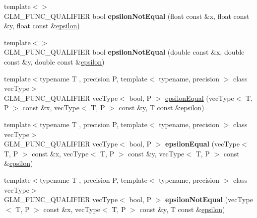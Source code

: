\begin{DoxyCompactItemize}
\item 
{\footnotesize template$<$$>$ }\\G\+L\+M\+\_\+\+F\+U\+N\+C\+\_\+\+Q\+U\+A\+L\+I\+F\+I\+ER bool {\bfseries epsilon\+Not\+Equal} (float const \&x, float const \&y, float const \&\hyperlink{group__gtc__constants_gacb41049b8d22c8aa90e362b96c524feb}{epsilon})\hypertarget{namespaceglm_af4127d65f4afc6e447d461bae25f90fe}{}\label{namespaceglm_af4127d65f4afc6e447d461bae25f90fe}

\item 
{\footnotesize template$<$$>$ }\\G\+L\+M\+\_\+\+F\+U\+N\+C\+\_\+\+Q\+U\+A\+L\+I\+F\+I\+ER bool {\bfseries epsilon\+Not\+Equal} (double const \&x, double const \&y, double const \&\hyperlink{group__gtc__constants_gacb41049b8d22c8aa90e362b96c524feb}{epsilon})\hypertarget{namespaceglm_a68d8ce38812c8599018e404afc79f088}{}\label{namespaceglm_a68d8ce38812c8599018e404afc79f088}

\item 
{\footnotesize template$<$typename T , precision P, template$<$ typename, precision $>$ class vec\+Type$>$ }\\G\+L\+M\+\_\+\+F\+U\+N\+C\+\_\+\+Q\+U\+A\+L\+I\+F\+I\+ER vec\+Type$<$ bool, P $>$ \hyperlink{group__gtc__epsilon_gaca9443f217dc36587624247245522331}{epsilon\+Equal} (vec\+Type$<$ T, P $>$ const \&x, vec\+Type$<$ T, P $>$ const \&y, T const \&\hyperlink{group__gtc__constants_gacb41049b8d22c8aa90e362b96c524feb}{epsilon})
\item 
{\footnotesize template$<$typename T , precision P, template$<$ typename, precision $>$ class vec\+Type$>$ }\\G\+L\+M\+\_\+\+F\+U\+N\+C\+\_\+\+Q\+U\+A\+L\+I\+F\+I\+ER vec\+Type$<$ bool, P $>$ {\bfseries epsilon\+Equal} (vec\+Type$<$ T, P $>$ const \&x, vec\+Type$<$ T, P $>$ const \&y, vec\+Type$<$ T, P $>$ const \&\hyperlink{group__gtc__constants_gacb41049b8d22c8aa90e362b96c524feb}{epsilon})\hypertarget{namespaceglm_abc7f87cb473f9c9d7d6109e96c139807}{}\label{namespaceglm_abc7f87cb473f9c9d7d6109e96c139807}

\item 
{\footnotesize template$<$typename T , precision P, template$<$ typename, precision $>$ class vec\+Type$>$ }\\G\+L\+M\+\_\+\+F\+U\+N\+C\+\_\+\+Q\+U\+A\+L\+I\+F\+I\+ER vec\+Type$<$ bool, P $>$ {\bfseries epsilon\+Not\+Equal} (vec\+Type$<$ T, P $>$ const \&x, vec\+Type$<$ T, P $>$ const \&y, T const \&\hyperlink{group__gtc__constants_gacb41049b8d22c8aa90e362b96c524feb}{epsilon})\hypertarget{namespaceglm_a76da74051c42eebf3256cd31464fa043}{}\label{namespaceglm_a76da74051c42eebf3256cd31464fa043}


\end{DoxyCompactItemize}

